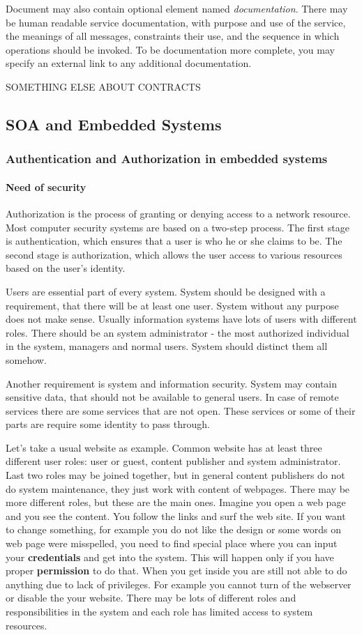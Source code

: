 Document may also contain optional element named \textit{documentation}.
There may be human readable service documentation, with   purpose and use of the service, the meanings of all messages, constraints their use, and the sequence in which operations should be invoked.
To be documentation more complete, you may specify an external link to any additional documentation.

SOMETHING ELSE ABOUT CONTRACTS

\subsection{SOA and Embedded Systems}


\subsubsection{Authentication and Authorization in embedded systems}
\paragraph{Need of security}
Authorization is the process of granting or denying access to a network resource.
Most computer security systems are based on a two-step process.
The first stage is authentication, which ensures that a user is who he or she claims to be.
The second stage is authorization, which allows the user access to various resources based on the user's identity. 

Users are essential part of every system. System should be designed with
a requirement, that there will be at least one user. System without any purpose
does not make sense. Usually information systems have lots of users with
different roles. There should be an system administrator - the most authorized individual
in the system, managers and normal users. System should distinct them all
somehow. 

Another requirement is system and information security. System may contain
sensitive data, that should not be available to general users. In case of remote
services there are some services that are not open. These services or some
of their parts are require some identity to pass through. 

Let's take a usual website as example. Common website has at least three
different user roles:
user or guest, content publisher and system administrator. Last two roles may be
joined together, but in general content publishers do not do system maintenance, they
just work with content of webpages. There may be more different roles, but these
are the main ones. Imagine you open a web page and you see the content. You
follow the links and surf the web site. If you want to change something, for
example you do not like the design or some words on web page were misspelled,
you need to find special place where you can input your \textbf{credentials} and
get into the system. This will happen only if you have proper
\textbf{permission} to do that. When you get inside you are still not able to do
anything due to lack of privileges. For example you cannot turn of the
webserver or disable the your website. There may be lots of different roles and
responsibilities in the system and each role has limited access to system
resources.

